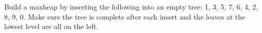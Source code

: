 Build a maxheap by inserting the following into an empty tree:
1, 3, 5, 7, 6, 4, 2, 8, 9, 0.
Make sure the tree is complete after each insert and the leaves
at the lowest level are all on the left.
